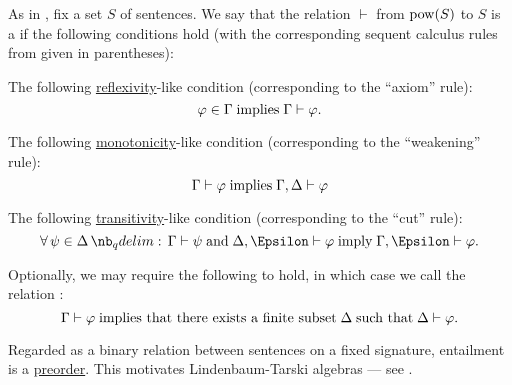 \begin{definition}\label{def:consequence_relation}
  As in , fix a set \( S \) of sentences. We say that the relation \( \vdash \) from \( \operatorname{pow}(S) \) to \( S \) is a  if the following conditions hold (with the corresponding sequent calculus rules from \cite[29]{TroelstraSchwichtenberg2000} given in parentheses):
  \begin{thmenum}
     The following \hyperref[def:binary_relation/reflexive]{reflexivity}-like condition (corresponding to the \enquote{axiom} rule):
    \begin{equation}\label{eq:def:consequence_relation/reflexivity}
      \varphi \in \Gamma \T{implies} \Gamma \vdash \varphi.
    \end{equation}

     The following \hyperref[def:order_function/preserving]{monotonicity}-like condition (corresponding to the \enquote{weakening} rule):
    \begin{equation}\label{eq:def:consequence_relation/monotonicity}
      \Gamma \vdash \varphi \T{implies} \Gamma, \Delta \vdash \varphi
    \end{equation}

     The following \hyperref[def:binary_relation/transitive]{transitivity}-like condition (corresponding to the \enquote{cut} rule):
    \begin{equation}\label{eq:def:consequence_relation/transitivity}
      \quantifier \forall {\psi \in \Delta} \Gamma \vdash \psi \T{and} \Delta, \Epsilon \vdash \varphi \T{imply} \Gamma, \Epsilon \vdash \varphi.
    \end{equation}

     Optionally, we may require the following to hold, in which case we call the relation :
    \begin{equation}\label{eq:def:consequence_relation/compactness}
      \Gamma \vdash \varphi \T{implies that there exists a finite subset} \Delta \T{such that} \Delta \vdash \varphi.
    \end{equation}
  \end{thmenum}
\end{definition}
\begin{comments}
  \item Regarded as a binary relation between sentences on a fixed signature, entailment is a \hyperref[def:preordered_set]{preorder}. This motivates Lindenbaum-Tarski algebras --- see .
\end{comments}

